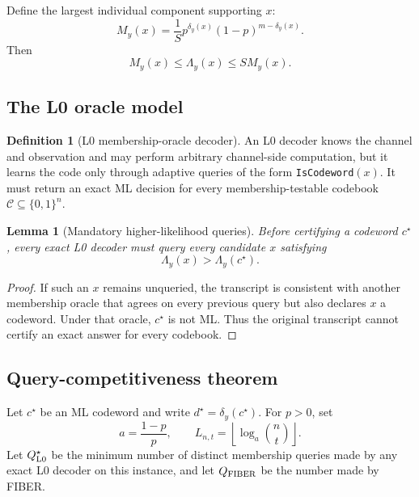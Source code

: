 \documentclass[11pt]{article}
\newtheorem{lemma}{Lemma}
\theoremstyle{definition}
\newtheorem{definition}{Definition}
\theoremstyle{remark}
\newcommand{\C}{\mathcal C}
\newcommand{\Qfib}{Q_{\rm FIBER}}
\newcommand{\Qopt}{Q_{\rm L0}^{\star}}
\begin{document}
Define the largest individual component supporting $x$:
\[
M_y(x)=\frac1S p^{\delta_y(x)}(1-p)^{m-\delta_y(x)}.
\]
Then
\begin{equation}
M_y(x)\le\Lambda_y(x)\le S M_y(x).
\label{eq:sandwich}
\end{equation}

\subsection{The L0 oracle model}
\begin{definition}[L0 membership-oracle decoder]
An L0 decoder knows the channel and observation and may perform arbitrary channel-side computation, but it learns the code only through adaptive queries of the form \texttt{IsCodeword}$(x)$.  It must return an exact ML decision for every membership-testable codebook $\C\subseteq\{0,1\}^n$.
\end{definition}

\begin{lemma}[Mandatory higher-likelihood queries]
\label{lem:mandatory}
Before certifying a codeword $c^\star$, every exact L0 decoder must query every candidate $x$ satisfying
\[
\Lambda_y(x)>\Lambda_y(c^\star).
\]
\end{lemma}
\begin{proof}
If such an $x$ remains unqueried, the transcript is consistent with another membership oracle that agrees on every previous query but also declares $x$ a codeword.  Under that oracle, $c^\star$ is not ML.  Thus the original transcript cannot certify an exact answer for every codebook.
\end{proof}

\subsection{Query-competitiveness theorem}
Let $c^\star$ be an ML codeword and write $d^\star=\delta_y(c^\star)$.  For $p>0$, set
\[
a=\frac{1-p}{p},\qquad L_{n,t}=\left\lfloor\log_a\binom nt\right\rfloor.
\]
Let $\Qopt$ be the minimum number of distinct membership queries made by any exact L0 decoder on this instance, and let $\Qfib$ be the number made by FIBER.
\end{document}
